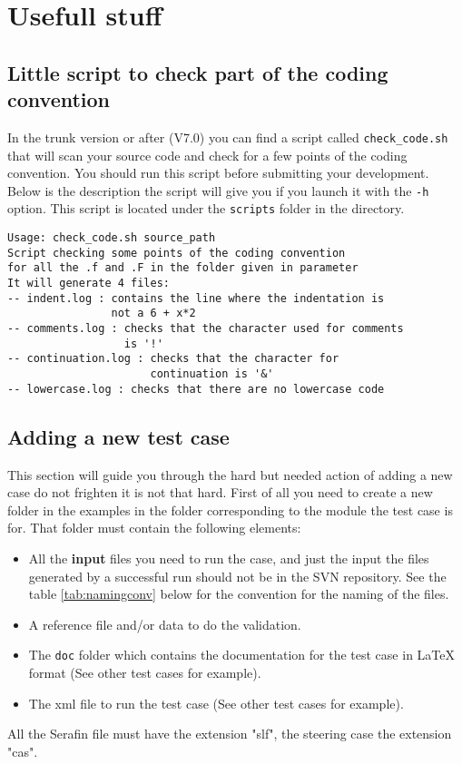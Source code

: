 %
\chapter{Usefull stuff}
%
\section{Little script to check part of the coding convention}
%
In the trunk version or after (V7.0) you can find a script called
\verb!check_code.sh! that will scan your source code and check for a few points
of the coding convention. You should run this script before submitting your
development. Below is the description the script will give you if you launch it
with the \verb!-h! option. This script is located under the \verb!scripts!
folder in the \telemacsystem directory.
\begin{lstlisting}
Usage: check_code.sh source_path
Script checking some points of the coding convention
for all the .f and .F in the folder given in parameter
It will generate 4 files:
-- indent.log : contains the line where the indentation is
                not a 6 + x*2
-- comments.log : checks that the character used for comments
                  is '!'
-- continuation.log : checks that the character for
                      continuation is '&'
-- lowercase.log : checks that there are no lowercase code
\end{lstlisting}

\section{Adding a new test case}
%
\label{testcase}
This section will guide you through the hard but needed action of adding a new
case do not frighten it is not that hard. First of all you need to create a new
folder in the examples in the folder corresponding to the module the test case
is for. That folder must contain the following elements:
\begin{itemize}
\item All the \textbf{input} files you need to run the case, and just the input
the files generated by a successful run should not be in the SVN repository.
See the table \ref{tab:namingconv} below for the convention for the naming of
the files.
\item A reference file and/or data to do the validation.
\item The \verb!doc! folder which contains the documentation for the test case
in LaTeX format (See other test cases for example).
\item The xml file to run the test case (See other test cases for example).
\end{itemize}
All the Serafin file must have the extension "slf", the steering case the
extension "cas".

